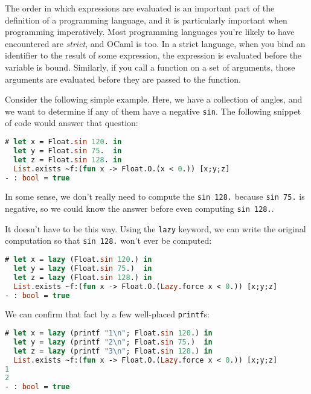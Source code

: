 The order in which expressions are evaluated is an important part of the
definition of a programming language, and it is particularly important
when programming imperatively. Most programming languages you're likely
to have encountered are \emph{strict}, and OCaml is too. In a strict
language, when you bind an identifier to the result of some expression,
the expression is evaluated before the variable is bound. Similarly, if
you call a function on a set of arguments, those arguments are evaluated
before they are passed to the function.

Consider the following simple example. Here, we have a collection of
angles, and we want to determine if any of them have a negative
\passthrough{\lstinline!sin!}. The following snippet of code would
answer that question:

\begin{lstlisting}[language=Caml]
# let x = Float.sin 120. in
  let y = Float.sin 75.  in
  let z = Float.sin 128. in
  List.exists ~f:(fun x -> Float.O.(x < 0.)) [x;y;z]
- : bool = true
\end{lstlisting}

In some sense, we don't really need to compute the
\passthrough{\lstinline!sin 128.!} because
\passthrough{\lstinline!sin 75.!} is negative, so we could know the
answer before even computing \passthrough{\lstinline!sin 128.!}.

It doesn't have to be this way. Using the \passthrough{\lstinline!lazy!}
keyword, we can write the original computation so that
\passthrough{\lstinline!sin 128.!} won't ever be computed:

\begin{lstlisting}[language=Caml]
# let x = lazy (Float.sin 120.) in
  let y = lazy (Float.sin 75.)  in
  let z = lazy (Float.sin 128.) in
  List.exists ~f:(fun x -> Float.O.(Lazy.force x < 0.)) [x;y;z]
- : bool = true
\end{lstlisting}

We can confirm that fact by a few well-placed
\passthrough{\lstinline!printf!}s:

\begin{lstlisting}[language=Caml]
# let x = lazy (printf "1\n"; Float.sin 120.) in
  let y = lazy (printf "2\n"; Float.sin 75.)  in
  let z = lazy (printf "3\n"; Float.sin 128.) in
  List.exists ~f:(fun x -> Float.O.(Lazy.force x < 0.)) [x;y;z]
1
2
- : bool = true
\end{lstlisting}

